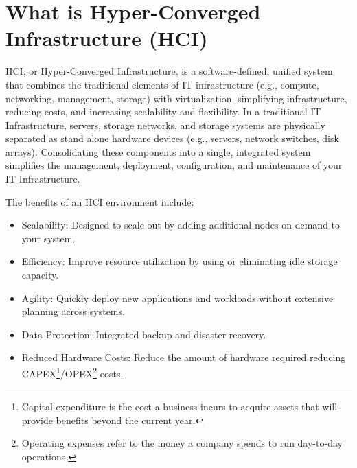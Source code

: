 \section{What is Hyper-Converged Infrastructure (HCI)} \label{section: HCI}

HCI, or Hyper-Converged Infrastructure, is a software-defined, unified system that combines the traditional elements of IT infrastructure (e.g., compute, networking, management, storage) with virtualization, simplifying infrastructure, reducing costs, and increasing scalability and flexibility. In a traditional IT Infrastructure, servers, storage networks, and storage systems are physically separated as stand alone hardware devices (e.g., servers, network switches, disk arrays). Consolidating these components into a single, integrated system simplifies the management, deployment, configuration, and maintenance of your IT Infrastructure. 

The benefits of an HCI environment include: 
\begin{itemize}
    \item Scalability: Designed to scale out by adding additional nodes on-demand to your system.
    \item Efficiency: Improve resource utilization by using or eliminating idle storage capacity.
    \item Agility: Quickly deploy new applications and workloads without extensive planning across systems. 
    \item Data Protection: Integrated backup and disaster recovery.
    \item Reduced Hardware Costs: Reduce the amount of hardware required reducing CAPEX\footnote{Capital expenditure is the cost a business incurs to acquire assets that will provide benefits beyond the current year.}/OPEX\footnote{Operating expenses refer to the money a company spends to run day-to-day operations.} costs. 
\end{itemize}


